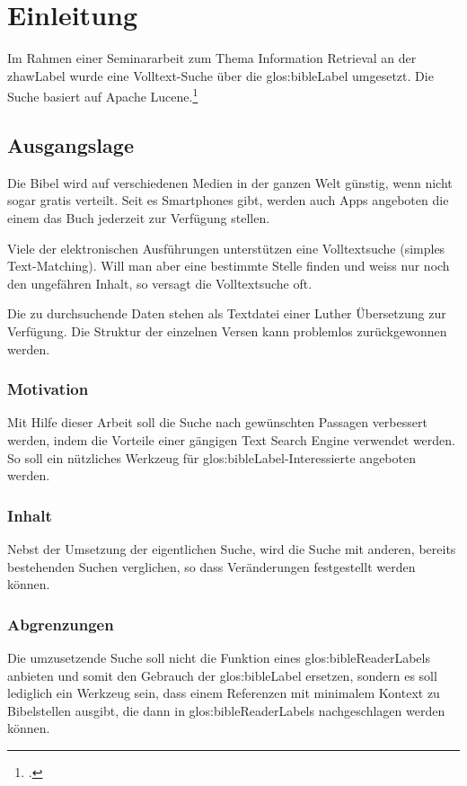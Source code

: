 
\chapter{Einleitung}
Im Rahmen einer Seminararbeit zum Thema Information Retrieval an der \gls{zhawLabel} wurde eine Volltext-Suche über die \gls{glos:bibleLabel} umgesetzt. Die Suche basiert auf Apache Lucene.\footcite{Apache_Lucene_2016-05-07}

\section{Ausgangslage}
Die Bibel wird auf verschiedenen Medien in der ganzen Welt günstig, wenn nicht sogar gratis verteilt.
Seit es Smartphones gibt, werden auch Apps angeboten die einem das Buch jederzeit zur Verfügung stellen.

Viele der elektronischen Ausführungen unterstützen eine Volltextsuche (simples Text-Matching).
Will man aber eine bestimmte Stelle finden und weiss nur noch den ungefähren Inhalt, so versagt die Volltextsuche oft.

Die zu durchsuchende Daten stehen als Textdatei einer Luther Übersetzung zur Verfügung. Die Struktur der einzelnen Versen kann problemlos zurückgewonnen werden.

\subsection{Motivation}
Mit Hilfe dieser Arbeit soll die Suche nach gewünschten Passagen verbessert werden, indem die Vorteile einer gängigen Text Search Engine verwendet werden.
So soll ein nützliches Werkzeug für \gls{glos:bibleLabel}-Interessierte angeboten werden.

\subsection{Inhalt}
Nebst der Umsetzung der eigentlichen Suche, wird die Suche mit anderen, bereits bestehenden Suchen verglichen, so dass Veränderungen festgestellt werden können.

\subsection{Abgrenzungen}
Die umzusetzende Suche soll nicht die Funktion eines \gls{glos:bibleReaderLabel}s anbieten und somit den Gebrauch der \gls{glos:bibleLabel} ersetzen, sondern es soll lediglich ein Werkzeug sein, dass einem Referenzen mit minimalem Kontext zu Bibelstellen ausgibt, die dann in \glspl{glos:bibleReaderLabel} nachgeschlagen werden können.

